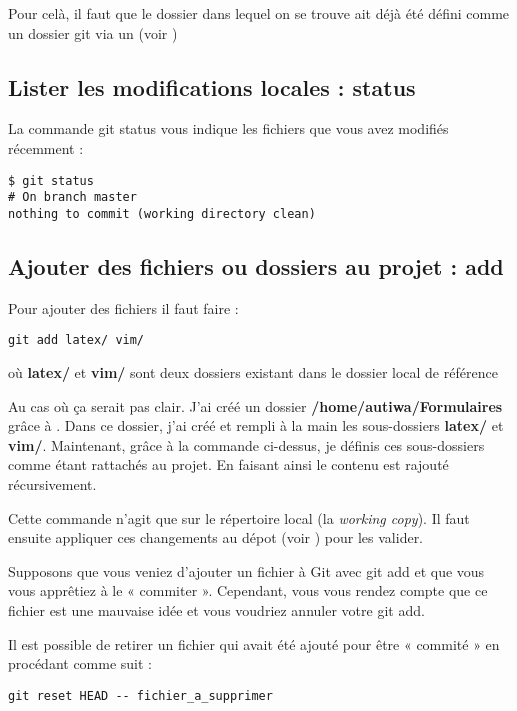 \documentclass[a4paper,twoside]{article}
\begin{document}
Pour celà, il faut que le dossier dans lequel on se trouve ait déjà été défini comme un dossier git via un  (voir )

\subsection{Lister les modifications locales : status}
La commande git status vous indique les fichiers que vous avez modifiés récemment :
\begin{verbatim}
$ git status
# On branch master
nothing to commit (working directory clean)
\end{verbatim}

\subsection{Ajouter des fichiers ou dossiers au projet : add} 
Pour ajouter des fichiers il faut faire :
\begin{verbatim}
git add latex/ vim/ 
\end{verbatim}
où \textbf{latex/} et \textbf{vim/} sont deux dossiers existant dans le dossier local de référence

\begin{remarque}
Au cas où ça serait pas clair. J'ai créé un dossier \textbf{/home/autiwa/Formulaires} grâce à . Dans ce dossier, j'ai créé et rempli à la main les sous-dossiers \textbf{latex/} et \textbf{vim/}. Maintenant, grâce à la commande ci-dessus, je définis ces sous-dossiers comme étant rattachés au projet. En faisant ainsi le contenu est rajouté récursivement.
\end{remarque}

\begin{attention}
Cette commande n'agit que sur le répertoire local (la \emph{working copy}). Il faut ensuite appliquer ces changements au dépot (voir ) pour les valider.
\end{attention}

\bigskip

Supposons que vous veniez d’ajouter un fichier à Git avec git add et que vous vous apprêtiez à le « commiter ». Cependant, vous vous rendez compte que ce fichier est une mauvaise idée et vous voudriez annuler votre git add.

Il est possible de retirer un fichier qui avait été ajouté pour être « commité » en procédant comme suit :
\begin{verbatim}
git reset HEAD -- fichier_a_supprimer
\end{verbatim}
\end{document}
